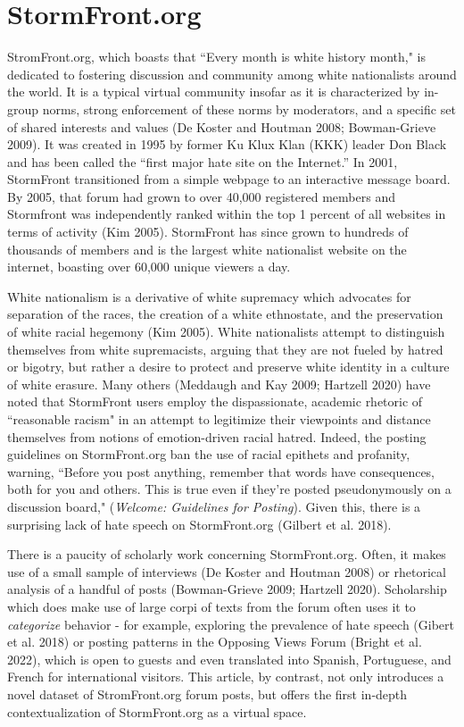 \documentclass[12pt]{paper}
\begin{document}
\section{StormFront.org}
StromFront.org, which boasts that ``Every month is white history month," is dedicated to fostering discussion and community among white nationalists around the world. It is a typical virtual community insofar as it is characterized by in-group norms, strong enforcement of these norms by moderators, and a specific set of shared interests and values (De Koster and Houtman 2008; Bowman-Grieve 2009). It was created in 1995 by former Ku Klux Klan (KKK) leader Don Black and has been called the “first major hate site on the Internet.” In 2001, StormFront transitioned from a simple webpage to an interactive message board. By 2005, that forum had grown to over 40,000 registered members and Stormfront was independently ranked within the top 1 percent of all websites in terms of activity (Kim 2005). StormFront has since grown to hundreds of thousands of members and is the largest white nationalist website on the internet, boasting over 60,000 unique viewers a day.

White nationalism is a derivative of white supremacy which advocates for separation of the races, the creation of a white ethnostate, and the preservation of white racial hegemony (Kim 2005). White nationalists attempt to distinguish themselves from white supremacists, arguing that they are not fueled by hatred or bigotry, but rather a desire to protect and preserve white identity in a culture of white erasure. Many others (Meddaugh and Kay 2009; Hartzell 2020) have noted that StormFront users employ the dispassionate, academic rhetoric of ``reasonable racism" in an attempt to legitimize their viewpoints and distance themselves from notions of emotion-driven racial hatred. Indeed, the posting guidelines on StormFront.org ban the use of racial epithets and profanity, warning, ``Before you post anything, remember that words have consequences, both for you and others. This is true even if they're posted pseudonymously on a discussion board," (\textit{Welcome: Guidelines for Posting}). Given this, there is a surprising lack of hate speech on StormFront.org (Gilbert et al. 2018).

There is a paucity of scholarly work concerning StormFront.org. Often, it makes use of a small sample of interviews (De Koster and Houtman 2008) or rhetorical analysis of a handful of posts (Bowman-Grieve 2009; Hartzell 2020). Scholarship which does make use of large corpi of texts from the forum often uses it to \textit{categorize} behavior - for example, exploring the prevalence of hate speech (Gibert et al. 2018) or posting patterns in the Opposing Views Forum (Bright et al. 2022), which is open to guests and even translated into Spanish, Portuguese, and French for international visitors. This article, by contrast, not only introduces a novel dataset of StromFront.org forum posts, but offers the first in-depth contextualization of StormFront.org as a virtual space.
\end{document}
